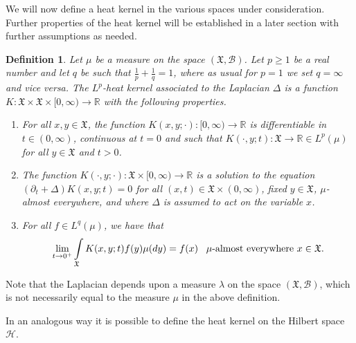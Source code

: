\documentclass[11pt,reqno]{amsart}
\newtheorem{definition}[theorem]{Definition}
\theoremstyle{remark}
\theoremstyle{definition}
\numberwithin{theorem}{section} \numberwithin{equation}{section}
\newcommand{\X}{\mathfrak{X}}
\begin{document}
We will now define a heat kernel in the various spaces under consideration.  Further properties of
the heat kernel will be established in a later section with further assumptions as needed.

\begin{definition} \label{def: HK lp space} Let $\mu$ be a measure on the space $(\X,\mathcal{B})$.
  Let $p\geq 1$ be a real number and let $q$ be such that  $\frac{1}{p}+\frac1q=1$, where as usual for $p=1$ we set $q=\infty$ and vice versa.
  The $L^p$-heat kernel associated to the Laplacian $\Delta$ is a function $K:\X\times\X\times[0,\infty)\to\mathbb{R}$ with the following properties.
  \begin{enumerate}[leftmargin=0.75in]
    \item For all $x,y\in\X$, the function $K(x,y;\cdot):[0,\infty)\to\mathbb{R}$ is differentiable in $t \in (0,\infty)$, continuous at $t=0$
     and such that $K(\cdot, y;t):\X\to\mathbb{R}\in L^p(\mu)$ for all $y\in\X$ and $t>0$.
    \item The function $K(\cdot,y;\cdot):\X\times[0,\infty)\to\mathbb{R}$ is a solution to the equation $(\partial_t+\Delta)K(x,y;t)=0$
for all $(x,t)\in \X\times(0,\infty)$, fixed $y\in\X$, $\mu$-almost everywhere, and where $\Delta$ is assumed to act on the variable $x$.
\item For all $f\in L^q(\mu)$, we have that
    \begin{equation}\label{eq. dirac delta cond HK}
\lim\limits_{t \rightarrow 0^{+}}\int\limits_{\X}K(x,y;t)f(y)\mu(dy)=f(x)
\,\,\,\,\,
\text{\rm $\mu$-almost everywhere $x\in\X$.}
\end{equation}
  \end{enumerate}
\end{definition}

Note that the Laplacian depends upon a measure $\lambda$ on the space $(\X,\mathcal{B})$,
which is not necessarily equal to the measure $\mu$ in the above definition.

In an analogous way it is possible to define the heat kernel on the Hilbert space $\mathcal{H}$.
\end{document}
